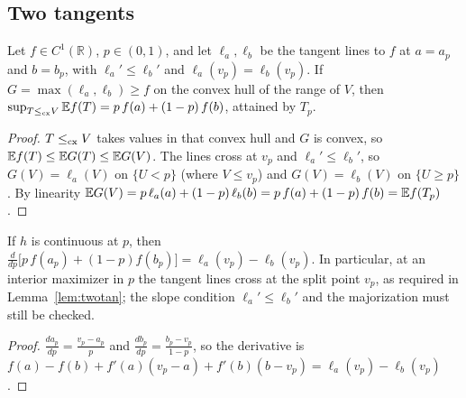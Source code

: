 \documentclass[11pt]{amsart}
\theoremstyle{definition}\newtheorem{definition}[theorem]{Definition}\theoremstyle{remark}\newtheorem{remark}[theorem]{Remark}
\begin{document}
\subsection{Two tangents}
\begin{lemma}\label{lem:twotan}
Let $f\in C^1(\mathbb R)$, $p\in(0,1)$, and let $\ell_a,\ell_b$ be the tangent lines to $f$ at $a=a_p$ and $b=b_p$, with $\ell_a'\le\ell_b'$ and $\ell_a(v_p)=\ell_b(v_p)$. If
$G=\max(\ell_a,\ell_b)\ge f$ on the convex hull of the range of $V$, then $\sup_{T\le_{\mathrm{cx}} V}\mathbb E f(T)=p\,f(a)+(1-p)\,f(b)$, attained by $T_p$.
\end{lemma}
\begin{proof}$T\le_{\mathrm{cx}} V$ takes values in that convex hull and $G$ is convex, so $\mathbb E f(T)\le\mathbb E G(T)\le\mathbb E G(V)$. The lines cross at $v_p$ and $\ell_a'\le\ell_b'$, so $G(V)=\ell_a(V)$ on $\{U<p\}$ (where $V\le v_p$) and
$G(V)=\ell_b(V)$ on $\{U\ge p\}$. By linearity $\mathbb E G(V)=p\,\ell_a(a)+(1-p)\,\ell_b(b)=p\,f(a)+(1-p)\,f(b)=\mathbb E f(T_p)$.\end{proof}
\begin{lemma}[stationarity]\label{lem:stat}
If $h$ is continuous at $p$, then $\frac{d}{dp}\bigl[p\,f(a_p)+(1-p)f(b_p)\bigr]=\ell_a(v_p)-\ell_b(v_p)$. In particular, at an interior maximizer in $p$ the
tangent lines cross at the split point $v_p$, as required in Lemma~\ref{lem:twotan}; the slope condition $\ell_a'\le\ell_b'$ and the majorization must still be checked.
\end{lemma}
\begin{proof}$\frac{da_p}{dp}=\frac{v_p-a_p}p$ and $\frac{db_p}{dp}=\frac{b_p-v_p}{1-p}$, so the derivative is $f(a)-f(b)+f'(a)(v_p-a)+f'(b)(b-v_p)=\ell_a(v_p)-\ell_b(v_p)$.\end{proof}
\end{document}
